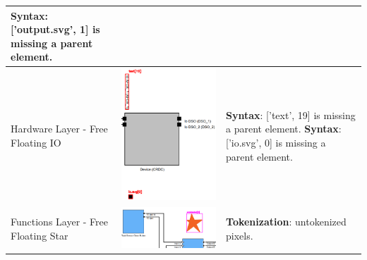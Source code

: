 \begin{longtable}{p{} >{\raggedright\arraybackslash}m{} >{\raggedright\arraybackslash}m{}}
        \textbf{Syntax}: ['output.svg', 1] is missing a parent element.\\
    \midrule
    Hardware Layer - Free Floating IO & \includegraphics[width=1\linewidth]{pictures/41_free_floating_input_output_clip.png} & \textbf{Syntax}: ['text', 19] is missing a parent element. \newline
        \textbf{Syntax}: ['io.svg', 0] is missing a parent element. \\
    \midrule
    Functions Layer - Free Floating Star & \includegraphics[width=1\linewidth]{pictures/42_free_floating_star_output_clip.png} & \textbf{Tokenization}: untokenized pixels. \\

\end{longtable}
